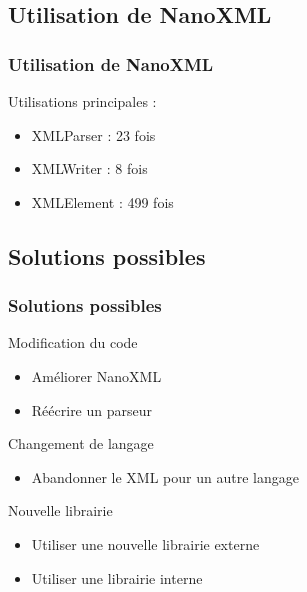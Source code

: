\subsection{Utilisation de NanoXML}
\begin{frame}\frametitle{Utilisation de NanoXML}
Utilisations principales :
\begin{itemize}
	\item XMLParser : 23 fois
	\item XMLWriter : 8 fois
	\item XMLElement : 499 fois
\end{itemize}
\end{frame}
\subsection{Solutions possibles}
\begin{frame}\frametitle{Solutions possibles}
\begin{minipage}[c]{.46\linewidth}
\begin{beamerboxesrounded}[shadow=true]{Modification du code}
\begin{itemize}
	\item Améliorer NanoXML
	\item Réécrire un parseur
\end{itemize}
\end{beamerboxesrounded}
\end{minipage}
\hfill
\begin{minipage}[c]{.46\linewidth}
\begin{beamerboxesrounded}[shadow=true]{Changement de langage}
\begin{itemize}
	\item Abandonner le XML pour un autre langage
\end{itemize}
\end{beamerboxesrounded}
\end{minipage}
\vfill
\hfil
\begin{minipage}[c]{.8\linewidth}
\begin{beamerboxesrounded}[shadow=true]{Nouvelle librairie}
\begin{itemize}
	\item Utiliser une nouvelle librairie externe
	\item Utiliser une librairie interne
\end{itemize}
\end{beamerboxesrounded}
\end{minipage}
\end{frame}
